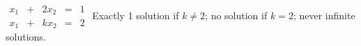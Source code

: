 {$\begin{array}{ccccc}x_1&+&2x_2&=&1\\x_1&+&kx_2&=&2\end{array}$}
{Exactly 1 solution if $k\neq 2$; no solution if $k=2$; never infinite solutions.}